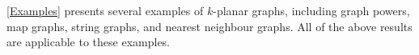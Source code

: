 \documentclass{patmorin}
\renewcommand{\le}{\leqslant}
\renewcommand{\geq}{\geqslant}
\begin{document}
\cref{Examples} presents several examples of $k$-planar graphs, including graph powers, map graphs, string graphs, and nearest neighbour graphs. All of the above results are applicable to these examples. 


%


%

\end{document}
